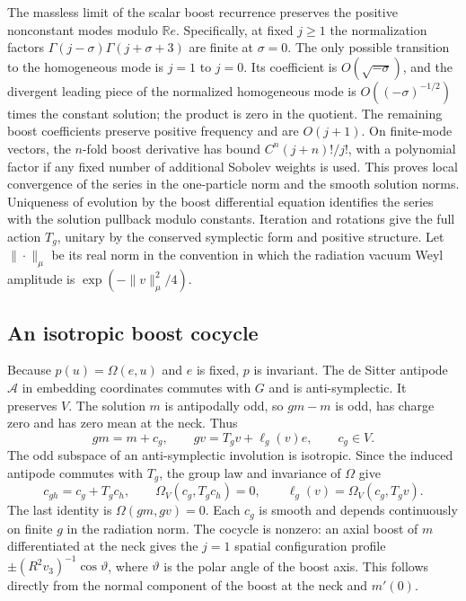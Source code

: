 \documentclass[11pt]{article}
\numberwithin{equation}{section}
\begin{document}
The massless limit of the scalar boost recurrence
\cite[Eqs.~(16)--(21), Sec.~2.2]{mmfree} preserves the positive
nonconstant modes modulo \(\mathbb R e\). Specifically, at fixed
\(j\ge1\) the normalization factors
\(\Gamma(j-\sigma)\Gamma(j+\sigma+3)\) are finite at \(\sigma=0\).
The only possible transition to the homogeneous mode is \(j=1\)
to \(j=0\). Its coefficient is \(O(\sqrt{-\sigma})\), and the
divergent leading piece of the normalized homogeneous mode is
\(O((-\sigma)^{-1/2})\) times the constant solution; the product
is zero in the quotient. The remaining boost coefficients
preserve positive frequency and are \(O(j+1)\).
On finite-mode vectors, the \(n\)-fold boost derivative has bound
\(C^n(j+n)!/j!\), with a polynomial factor if any fixed number
of additional Sobolev weights is used. This proves local
convergence of the series in the one-particle norm and the smooth
solution norms. Uniqueness of evolution by the boost differential
equation identifies the series with the solution pullback modulo
constants. Iteration and rotations give the full action \(T_g\),
unitary by the conserved symplectic form and positive structure.
Let \(\|\cdot\|_\mu\) be its real norm in the convention in which
the radiation vacuum Weyl amplitude is
\(\exp(-\|v\|_\mu^2/4)\).

\subsection{An isotropic boost cocycle}

Because \(p(u)=\Omega(e,u)\) and \(e\) is fixed, \(p\) is invariant.
The de Sitter antipode \(\mathcal A\) in embedding coordinates
commutes with \(G\) and is anti-symplectic. It preserves \(V\).
The solution \(m\) is antipodally odd, so \(gm-m\) is odd, has
charge zero and has zero mean at the neck. Thus
\begin{equation}
 gm=m+c_g,\qquad gv=T_gv+\ell_g(v)e,\qquad c_g\in V.
 \label{eq:split}
\end{equation}
The odd subspace of an anti-symplectic involution is isotropic.
Since the induced antipode commutes with \(T_g\), the group law
and invariance of \(\Omega\) give
\begin{equation}
 c_{gh}=c_g+T_gc_h,\qquad
 \Omega_V(c_g,T_gc_h)=0,\qquad
 \ell_g(v)=\Omega_V(c_g,T_gv).
 \label{eq:cocycle}
\end{equation}
The last identity is \(\Omega(gm,gv)=0\). Each \(c_g\) is smooth
and depends continuously on finite \(g\) in the radiation norm.
The cocycle is nonzero: an axial boost of \(m\) differentiated
at the neck gives the \(j=1\) spatial configuration profile
\(\pm(R^2v_3)^{-1}\cos\vartheta\), where \(\vartheta\) is the
polar angle of the boost axis. This follows directly from the
normal component of the boost at the neck and \(m'(0)\).
\end{document}
